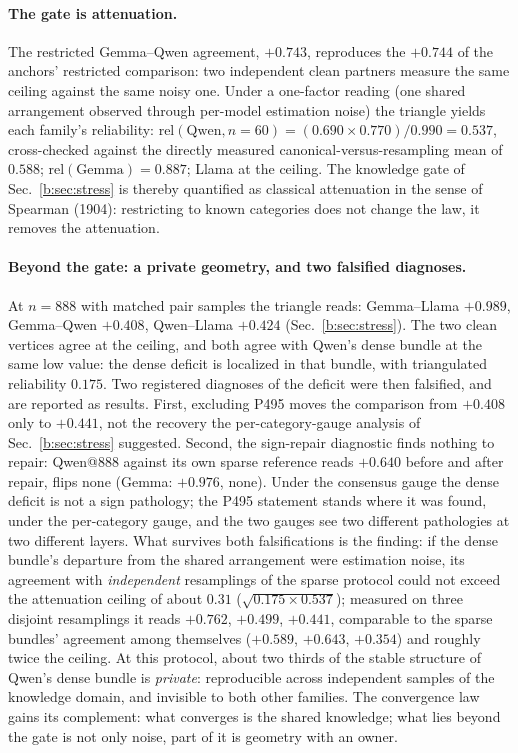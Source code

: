 \documentclass[11pt]{article}
\begin{document}
\paragraph{The gate is attenuation.} The restricted Gemma--Qwen agreement,
$+0.743$, reproduces the $+0.744$ of the anchors' restricted comparison:
two independent clean partners measure the same ceiling against the same
noisy one. Under a one-factor reading (one shared arrangement observed
through per-model estimation noise) the triangle yields each family's
reliability: $\mathrm{rel}(\text{Qwen}, n{=}60) = (0.690 \times 0.770) /
0.990 = 0.537$, cross-checked against the directly measured
canonical-versus-resampling mean of $0.588$; $\mathrm{rel}(\text{Gemma}) =
0.887$; Llama at the ceiling. The knowledge gate of
Sec.~\ref{b:sec:stress} is thereby quantified as classical attenuation in
the sense of Spearman (1904): restricting to known categories does not
change the law, it removes the attenuation.

\paragraph{Beyond the gate: a private geometry, and two falsified
diagnoses.} At $n{=}888$ with matched pair samples the triangle reads:
Gemma--Llama $+0.989$, Gemma--Qwen $+0.408$, Qwen--Llama $+0.424$
(Sec.~\ref{b:sec:stress}). The two clean vertices agree at the ceiling,
and both agree with Qwen's dense bundle at the same low value: the dense
deficit is localized in that bundle, with triangulated reliability
$0.175$. Two registered diagnoses of the deficit were then falsified, and
are reported as results. First, excluding P495 moves the comparison from
$+0.408$ only to $+0.441$, not the recovery the per-category-gauge
analysis of Sec.~\ref{b:sec:stress} suggested. Second, the sign-repair
diagnostic finds nothing to repair: Qwen@888 against its own sparse
reference reads $+0.640$ before and after repair, flips none (Gemma:
$+0.976$, none). Under the consensus gauge the dense deficit is not a
sign pathology; the P495 statement stands where it was found, under the
per-category gauge, and the two gauges see two different pathologies at
two different layers. What survives both falsifications is the finding:
if the dense bundle's departure from the shared arrangement were
estimation noise, its agreement with \emph{independent} resamplings of
the sparse protocol could not exceed the attenuation ceiling of about
$0.31$ ($\sqrt{0.175 \times 0.537}$); measured on three disjoint
resamplings it reads $+0.762$, $+0.499$, $+0.441$, comparable to the
sparse bundles' agreement among themselves ($+0.589$, $+0.643$, $+0.354$)
and roughly twice the ceiling. At this protocol, about two thirds of the
stable structure of Qwen's dense bundle is \emph{private}: reproducible
across independent samples of the knowledge domain, and invisible to both
other families. The convergence law gains its complement: what converges
is the shared knowledge; what lies beyond the gate is not only noise,
part of it is geometry with an owner.
\end{document}
